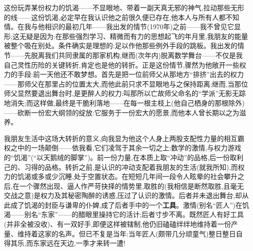 这份玩弄某份权力的饥渴——不显眼地、带着一副天真无邪的神气,拉动那些无形的线——这份饥渴,必定早在我认识他之前很久便已存在,他本人与所有人都不知情。在我与他相识的最初几年——我出发的情节(1970年)之前——我不曾见它显形;这无疑是因为:在那些强烈学习、精微而有力的思想起飞的年月里,我朋友的能量被整个吸在别处。条件确实是理想的:足以作他那些例外手段的跳板。我出发的情节——先脱离我们共同隶属的那家机构,继而(次年内)脱离数学舞台——不仅是我自己灵性历险的关键转折,肯定也是他的转折。正是这份情节,骤然为他敞开一些权力的手段:前一天他还不敢梦想。首先是把一位前师父从那地方“排挤”出去的权力——那师父在那里占的位置太大,而他此前只求不显眼地与之保持距离;继而,当那位师父显然要退出舞台时,是更醉人的权力:叫那所以亡故师父命名的“学派”无影无踪地消失;而这样做,最终是干脆利落地——在每一根主枝上(他自己栖身的那根除外)——砍断一份宏大纲领的绽放:它服务于一份宏大的愿景,而他本人曾长期以之为滋养。

我朋友生活中这场大转折的意义,向我显为他这个人身上两股支配性力量的相互霸权之中的一场颠倒——依我看,它们凌驾于其余一切之上:数学的激情,与权力游戏的“饥渴”(“以天鹅绒的脚掌”)。前一份力量,在本质上取“冲动”的品格,后一份取利己的、习得的品格。转折之前,是认识的冲动支配着我朋友的生活(就我所知),而权力的饥渴或多或少沉睡,处于空置状态。在短短几年间一段令人眩晕的社会攀升之后,在一个骤然出现、逼人作严苛抉择的情势里,取胜的(我相信是断然取胜,且毫无交战之意)是权力及其秘密陶醉的诱惑,压过了认识的激情。后者并未退出舞台,却从此成了饥渴的封臣与谦卑的仆婢,成了后者手中的一个\textbf{工具}。激情(别名“匠人”)在饥渴——别名“东家”——的醋眼里操持它的活计;后者寸步不离。既然匠人有好工具(并非全被没收)、有一双好手,即便这样被辖制,他仍旧磕磕绊绊地维持着一份产量、维持着这家的名声。但已不复是当年:当年匠人(颇带几分顽童气)整日整日自得其乐,而东家远在天边,一季才来转一遭!

